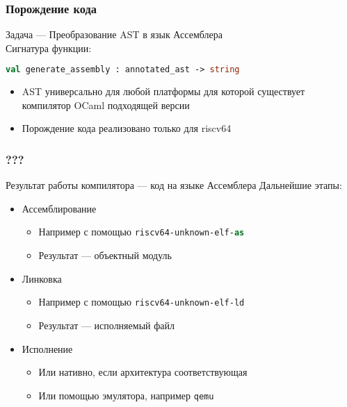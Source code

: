 \documentclass{beamer}
\begin{document}
\begin{frame}[fragile]
	\frametitle{Порождение кода}
	Задача — Преобразование AST в язык Ассемблера
	\\
	Сигнатура функции:
	\begin{lstlisting}[language=ML] 
	val generate_assembly : annotated_ast -> string
	\end{lstlisting}
	
	\begin{itemize}
		\item AST универсально для любой платформы для которой существует компилятор OCaml подходящей версии
		\item Порождение кода реализовано только для riscv64
	\end{itemize}
\end{frame}


\begin{frame}
	\frametitle{???}
	Результат работы компилятора — код на языке Ассемблера
	Дальнейшие этапы:
	\begin{itemize}
		\item Ассемблирование
		\begin{itemize}
			\item Например с помощью \lstinline[language=ML]|riscv64-unknown-elf-as|
			\item Результат — объектный модуль
		\end{itemize}
		\item Линковка
			\begin{itemize}
				\item Например с помощью \lstinline[language=ML]|riscv64-unknown-elf-ld|
				\item Результат — исполняемый файл
			\end{itemize}
		\item Исполнение
		\begin{itemize}
			\item Или нативно, если архитектура соответствующая
			\item Или помощью эмулятора, например \lstinline[language=ML]|qemu|
		\end{itemize}
	\end{itemize}
\end{frame}
\end{document}
